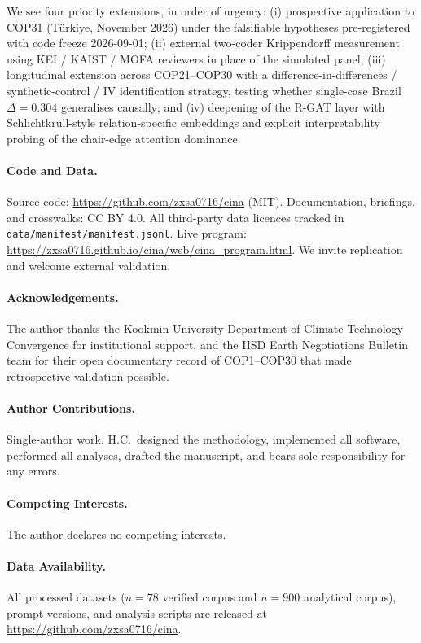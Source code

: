 \documentclass[11pt,a4paper]{article}
\begin{document}
We see four priority extensions, in order of urgency: (i) prospective application to COP31 (Türkiye, November 2026) under the falsifiable hypotheses pre-registered with code freeze 2026-09-01; (ii) external two-coder Krippendorff measurement using KEI / KAIST / MOFA reviewers in place of the simulated panel; (iii) longitudinal extension across COP21--COP30 with a difference-in-differences / synthetic-control / IV identification strategy, testing whether single-case Brazil $\Delta = 0.304$ generalises causally; and (iv) deepening of the R-GAT layer with Schlichtkrull-style relation-specific embeddings and explicit interpretability probing of the chair-edge attention dominance.

\paragraph{Code and Data.} Source code: \url{https://github.com/zxsa0716/cina} (MIT). Documentation, briefings, and crosswalks: CC BY 4.0. All third-party data licences tracked in \texttt{data/manifest/manifest.jsonl}. Live program: \url{https://zxsa0716.github.io/cina/web/cina\_program.html}. We invite replication and welcome external validation.

\paragraph{Acknowledgements.} The author thanks the Kookmin University Department of Climate Technology Convergence for institutional support, and the IISD Earth Negotiations Bulletin team for their open documentary record of COP1--COP30 that made retrospective validation possible.

\paragraph{Author Contributions.} Single-author work. H.C.\ designed the methodology, implemented all software, performed all analyses, drafted the manuscript, and bears sole responsibility for any errors.

\paragraph{Competing Interests.} The author declares no competing interests.

\paragraph{Data Availability.} All processed datasets ($n=78$ verified corpus and $n=900$ analytical corpus), prompt versions, and analysis scripts are released at \url{https://github.com/zxsa0716/cina}.



\end{document}
